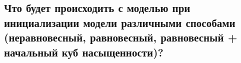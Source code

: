 

\subsection{Что будет происходить с моделью при инициализации модели различными способами (неравновесный, равновесный, равновесный + начальный куб насыщенности)?}



